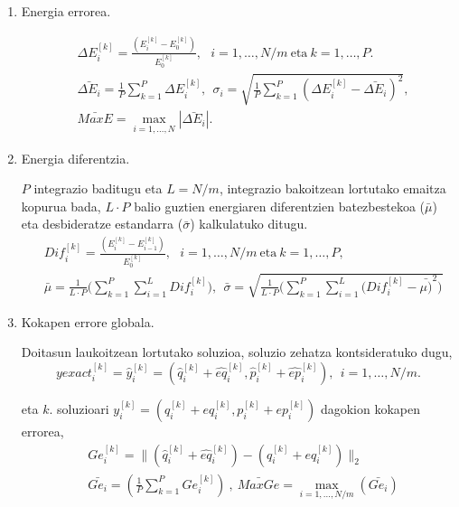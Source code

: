 \begin{enumerate}

\item Energia errorea.

\begin{align*}
&\Delta E_i^{[k]} =\frac{(E^{[k]}_i-E^{[k]}_0)}{E^{[k]}_0}, \ \ \ i=1,\dots,N/m \ \text{eta} \ k=1,\dots,P.\\
&\bar{\Delta E_i} =\frac{1}{P} \sum_{k=1}^{P} \Delta E_i^{[k]}, \ \  \sigma_i =\sqrt{\frac{1}{P} \sum_{k=1}^{P} (\Delta E_i^{[k]}-\bar{\Delta E_i})^2},\\
&\bar{MaxE } =\max_{i=1,\dots,N} |\bar{\Delta E_i}|.
\end{align*}  

\item Energia diferentzia.

$P$ integrazio baditugu eta $L=N/m$, integrazio bakoitzean lortutako emaitza kopurua bada, $L\cdot P$ balio guztien energiaren diferentzien batezbestekoa ($\bar{\mu}$) eta desbideratze estandarra ($\bar{\sigma}$) kalkulatuko ditugu.            
\begin{align*}
& Dif_i^{[k]} =\frac{(E^{[k]}_i-E^{[k]}_{i-1})}{E^{[k]}_0},\ \ \ i=1,\dots,N/m \ \text{eta} \ k=1,\dots,P, \\
& \bar{\mu} = \frac{1}{L\cdot P} \bigg(\sum_{k=1}^{P} \sum_{i=1}^{L} {Dif_i^{[k]}\bigg)}, \ \
 \bar{\sigma} = \sqrt{\frac{1}{L\cdot P} \bigg(\sum_{k=1}^{P} \sum_{i=1}^{L} {(Dif_i^{[k]}-\bar{\mu)}^2}\bigg)}          
\end{align*}
           
\item Kokapen errore globala.

Doitasun laukoitzean lortutako soluzioa, soluzio zehatza kontsideratuko dugu,           
\begin{equation*}
yexact^{[k]}_i=\hat{y}^{[k]}_i=(\hat{q}^{[k]}_i+\hat{eq}^{[k]}_i,\hat{p}^{[k]}_i+\hat{ep}^{[k]}_i),\ \ i=1,\dots,N/m .
\end{equation*}

eta $k.$ soluzioari ${y}^{[k]}_i=({q}^{[k]}_i+{eq}^{[k]}_i,{p}^{[k]}_i+{ep}^{[k]}_i)$ dagokion kokapen errorea,          
\begin{align*}
&Ge^{[k]}_i =\|(\hat{q}^{[k]}_i+\hat{eq}^{[k]}_i)-(q^{[k]}_i+eq^{[k]}_i)\|_2\\
&\bar{Ge_i} = \left(\frac{1}{P}\sum_{k=1}^{P} Ge^{[k]}_i \right) \ , \
                          \bar{MaxGe}=\max_{i=1,\dots,N/m} (\bar{Ge_i})
\end{align*}     
           

\end{enumerate}
